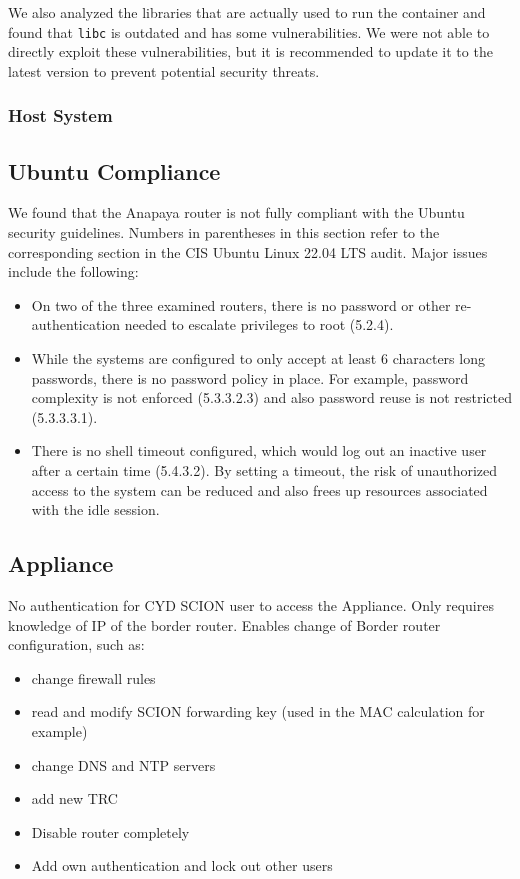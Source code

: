 We also analyzed the libraries that are actually used to run the container and found that \texttt{libc} is outdated and has some vulnerabilities.
We were not able to directly exploit these vulnerabilities, but it is recommended to update it to the latest version to prevent potential security threats.





\subsubsection{Host System}



\subsection{Ubuntu Compliance}
We found that the Anapaya router is not fully compliant with the Ubuntu security guidelines.
Numbers in parentheses in this section refer to the corresponding section in the CIS Ubuntu Linux 22.04 LTS audit.
Major issues include the following:
\begin{itemize}
    \item On two of the three examined routers, there is no password or other re-authentication needed to escalate privileges to root (5.2.4).
    \item While the systems are configured to only accept at least 6 characters long passwords, there is no password policy in place. For example, password complexity is not enforced (5.3.3.2.3) and also password reuse is not restricted (5.3.3.3.1).
    \item There is no shell timeout configured, which would log out an inactive user after a certain time (5.4.3.2). By setting a timeout, the risk of unauthorized access to the system can be reduced and also frees up resources associated with the idle session.
\end{itemize}


\subsection{Appliance}
No authentication for CYD SCION user to access the Appliance.
Only requires knowledge of IP of the border router.
Enables change of Border router configuration, such as:
\begin{itemize}
    \item change firewall rules
    \item read and modify SCION forwarding key (used in the MAC calculation for example)
    \item change DNS and NTP servers
    \item add new TRC
    \item Disable router completely
    \item Add own authentication and lock out other users
\end{itemize}


